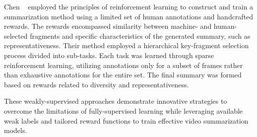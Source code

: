 Chen \etal~\cite{chen2019weakly} employed the principles of reinforcement learning to construct and train a summarization method using a limited set of human annotations and handcrafted rewards. The rewards encompassed similarity between machine- and human-selected fragments and specific characteristics of the generated summary, such as representativeness. Their method employed a hierarchical key-fragment selection process divided into sub-tasks. Each task was learned through sparse reinforcement learning, utilizing annotations only for a subset of frames rather than exhaustive annotations for the entire set. The final summary was formed based on rewards related to diversity and representativeness.

These weakly-supervised approaches demonstrate innovative strategies to overcome the limitations of fully-supervised learning while leveraging available weak labels and tailored reward functions to train effective video summarization models.
